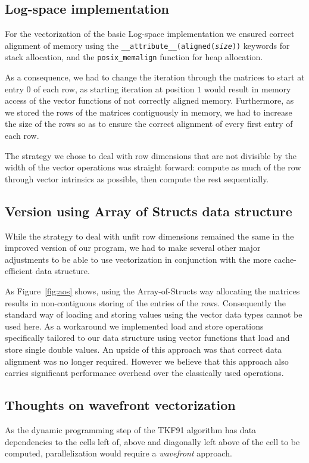 \documentclass{article}
\begin{document}
\subsection{Log-space implementation}
For the vectorization of the basic Log-space implementation we ensured correct alignment of memory using the \texttt{\_\_attribute\_\_(aligned(\textit{size}))} keywords for stack allocation, and the \texttt{posix\_memalign} function for heap allocation.

As a consequence, we had to change the iteration through the matrices to start at entry $0$ of each row, as starting iteration at position $1$ would result in memory access of the vector functions of not correctly aligned memory. Furthermore, as we stored the rows of the matrices contiguously in memory, we had to increase the size of the rows so as to ensure the correct alignment of every first entry of each row.

The strategy we chose to deal with row dimensions that are not divisible by the width of the vector operations was straight forward: compute as much of the row through vector intrinsics as possible, then compute the rest sequentially. 

\subsection{Version using Array of Structs data structure}
While the strategy to deal with unfit row dimensions remained the same in the improved version of our program, we had to make several other major adjustments to be able to use vectorization in conjunction with the more cache-efficient data structure.

As Figure~\ref{fig:aos} shows, using the Array-of-Structs way allocating the matrices results in non-contiguous storing of the entries of the rows. Consequently the standard way of loading and storing values using the vector data types cannot be used here. As a workaround we implemented load and store operations specifically tailored to our data structure using vector functions that load and store single double values. An upside of this approach was that correct data alignment was no longer required. However we believe that this approach also carries significant performance overhead over the classically used operations.

\subsection{Thoughts on wavefront vectorization}
As the dynamic programming step of the TKF91 algorithm has data dependencies to the cells left of, above and diagonally left above of the cell to be computed, parallelization would require a \textit{wavefront} approach.
\end{document}
